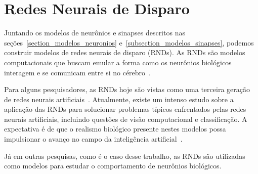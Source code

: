 \section{Redes Neurais de Disparo}

Juntando os modelos de neurônios e sinapses descritos nas seções~\ref{section_modelos_neuronios}
e~\ref{subsection_modelos_sinapses}, podemos construir modelos de redes neurais de disparo (RNDs). As RNDs são modelos
computacionais que buscam emular a forma como os neurônios biológicos interagem e se comunicam entre si no
cérebro~\cite{yamazakiSpiking2022}. 

Para alguns pesquisadores, as RNDs hoje são vistas como uma terceira geração de redes neurais
artificiais~\cite{maassNetworks1997}. Atualmente, existe um intenso estudo sobre a aplicação das RNDs para solucionar problemas
típicos enfrentados pelas redes neurais artificiais, incluindo questões de visão computacional e classificação. A expectativa é de
que o realismo biológico presente nestes modelos possa impulsionar o avanço no campo da inteligência
artificial~\cite{yamazakiSpiking2022}.

Já em outras pesquisas, como é o caso desse trabalho, as RNDs são utilizadas como modelos para estudar o comportamento de
neurônios biológicos.

